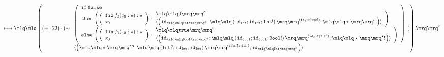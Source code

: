 \documentclass{article}
\begin{document}
\begin{align*}
\longmapsto &\;\quot{\left(\left(+\cdot 22\right)\cdot (\sim \begin{array}{l}\left(\begin{array}{l}\mathtt{if}\,\mathtt{false}\\\mathtt{then}\,\left(\left(\begin{array}{l} \mathtt{fix}\; \mathit{f}_{0}(\mathit{x}_{0}:\star): \star\\\mathit{x}_{0}\end{array}\right)\cdot \begin{array}{l}\quot{0}^{\varepsilon}\\\langle\left(\mathtt{id}_{\quot{\mathtt{Int}}^{\varepsilon}};\quot{\left(\mathtt{id}_{\mathtt{Int}};\mathtt{id}_{\mathtt{Int}};\mathtt{Int}!\right)}^{\left(\mathtt{id}_{\varepsilon};\varepsilon \uparrow \varepsilon;\varepsilon!\right)};\quot{\star}^{\star}!\right)\rangle\end{array}\right)\\\mathtt{else}\,\left(\left(\begin{array}{l} \mathtt{fix}\; \mathit{f}_{0}(\mathit{x}_{0}:\star): \star\\\mathit{x}_{0}\end{array}\right)\cdot \begin{array}{l}\quot{\mathtt{true}}^{\varepsilon}\\\langle\left(\mathtt{id}_{\quot{\mathtt{Bool}}^{\varepsilon}};\quot{\left(\mathtt{id}_{\mathtt{Bool}};\mathtt{id}_{\mathtt{Bool}};\mathtt{Bool}!\right)}^{\left(\mathtt{id}_{\varepsilon};\varepsilon \uparrow \varepsilon;\varepsilon!\right)};\quot{\star}^{\star}!\right)\rangle\end{array}\right)\end{array}\right)\\\langle\left(\quot{\star}^{\star}?;\quot{\left(\mathtt{Int}?;\mathtt{id}_{\mathtt{Int}};\mathtt{id}_{\mathtt{Int}}\right)}^{\left(\varepsilon?;\varepsilon \uparrow \varepsilon;\mathtt{id}_{\varepsilon}\right)};\mathtt{id}_{\quot{\mathtt{Int}}^{\varepsilon}}\right)\rangle\end{array})\right)}^{\varepsilon}\\ 

\end{align*}
\end{document}
